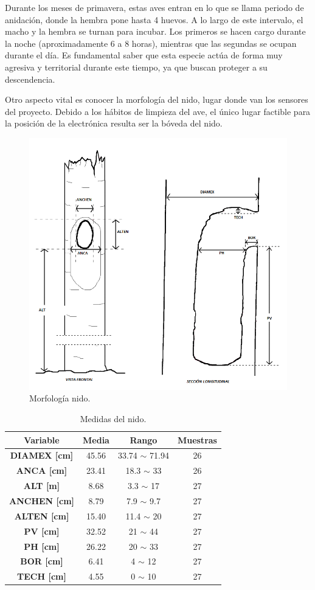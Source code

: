 Durante los meses de primavera, estas aves entran en lo que se llama periodo de anidación, donde la hembra pone hasta 4 huevos. A lo largo de este intervalo, el macho y la hembra se turnan para incubar. Los primeros se hacen cargo durante la noche (aproximadamente 6 a 8 horas), mientras que las segundas se ocupan durante el día. Es fundamental saber que esta especie actúa de forma muy agresiva y territorial durante este tiempo, ya que buscan proteger a su descendencia.

Otro aspecto vital es conocer la morfología del nido, lugar donde van los sensores del proyecto. Debido a los hábitos de limpieza del ave, el único lugar factible para la posición de la electrónica resulta ser la bóveda del nido.
\begin{figure}[H]
	\centering
	\includegraphics[width=0.5\linewidth]{ImagenesIntroduccion/morfologia_nido}
	\caption{Morfología nido.}
	\label{fig:morfología_nido}
\end{figure}

\begin{table}[H]
\centering
\begin{tabular}{|c|c|c|c|}
\hline
\textbf{Variable}    & \textbf{Media} & \textbf{Rango}     & \textbf{Muestras} \\ \hline
\textbf{DIAMEX [cm]} & 45.56          & 33.74 $\sim$ 71.94 & 26                \\ \hline
\textbf{ANCA [cm]}   & 23.41          & 18.3 $\sim$ 33     & 26                \\ \hline
\textbf{ALT [m]}     & 8.68           & 3.3 $\sim$ 17      & 27                \\ \hline
\textbf{ANCHEN [cm]} & 8.79           & 7.9 $\sim$ 9.7     & 27                \\ \hline
\textbf{ALTEN [cm]}  & 15.40          & 11.4 $\sim$ 20     & 27                \\ \hline
\textbf{PV [cm]}     & 32.52          & 21 $\sim$ 44       & 27                \\ \hline
\textbf{PH [cm]}     & 26.22          & 20 $\sim$ 33       & 27                \\ \hline
\textbf{BOR [cm]}    & 6.41           & 4 $\sim$ 12        & 27                \\ \hline
\textbf{TECH [cm]}   & 4.55           & 0 $\sim$ 10        & 27                \\ \hline
\end{tabular}
\caption{Medidas del nido.}
\label{tab:medidasNido}
\end{table}

